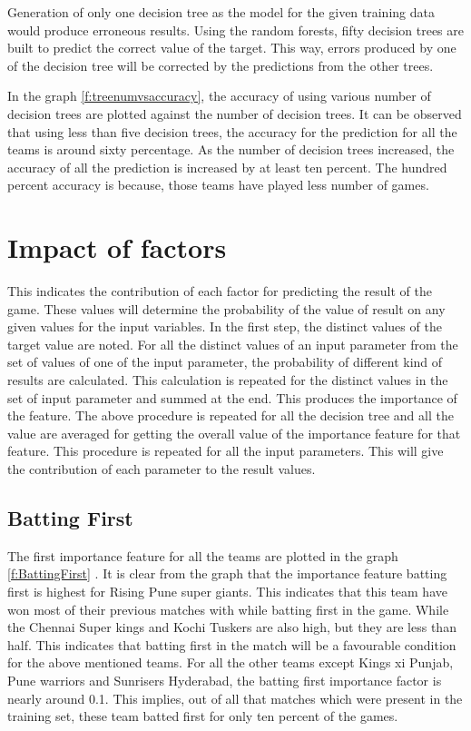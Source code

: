 \documentclass[sigconf]{acmart}
\begin{document}
Generation of only one decision tree as the model for the given training data would produce erroneous results. Using the random forests, fifty decision trees are built to predict the correct value of the target. This way, errors produced by one of the decision tree will be corrected by the predictions from the other trees.


In the graph \ref{f:treenumvsaccuracy}, the accuracy of using various number of decision trees are plotted against the number of decision trees. It can be observed that using less than five decision trees, the accuracy for the prediction for all the teams is around sixty percentage. As the number of decision trees increased, the accuracy of all the prediction is increased by at least ten percent. The hundred percent accuracy is because, those teams have played less number of games.

\section{Impact of factors}

This indicates the contribution of each factor for predicting the result of the game. These values will determine the probability of the value of result on any given values for the input variables. In the first step, the distinct values of the target value are noted. For all the distinct values of an input parameter from the set of values of one of the input parameter, the probability of different kind of results  are calculated. This calculation is repeated for the distinct values in the set of input parameter and summed at the end. This produces the importance of the feature. The above procedure is repeated for all the decision tree and all the value are averaged for getting the overall value of the importance feature for that feature. This procedure is repeated for all the input parameters. This will give the contribution of each parameter to the result values. 

\subsection{Batting First}

The first importance feature for all the teams are plotted in the graph \ref{f:BattingFirst} . It is clear from the graph that the importance feature batting first is highest for Rising Pune super giants. This indicates that this team have won most of their previous matches with while batting first in the game. While the Chennai Super kings and Kochi Tuskers are also high, but they are less than half. This indicates that batting first in the match will be a favourable condition for the above mentioned   teams. For all the other teams except Kings xi Punjab, Pune warriors and Sunrisers Hyderabad, the batting first importance factor is nearly around 0.1. This implies, out of all that matches which were present in the training set, these team batted first for only ten percent of the games. 
\end{document}
